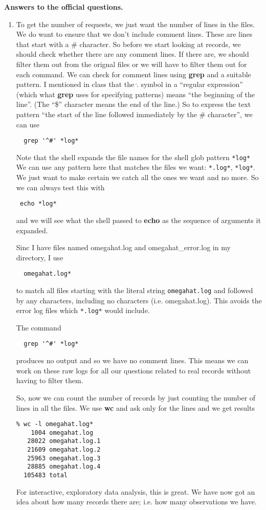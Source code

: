 \documentclass[10pt]{article}
\def\executable#1{\textbf{#1}}
\begin{document}
\textbf{Answers to the official questions.}
\begin{enumerate}
\item 
To get the number of requests, we just want the number of lines in the
files. We do want to ensure that we don't include comment lines.
These are lines that start with a \# character.
So before we start looking at records, we should check whether there
are any comment lines. If there are, we should filter them out from
the orignal files or we will have to filter them out for each command.
We can check for comment lines  using 
\executable{grep} and a suitable pattern. 
I mentioned in class that the $\hat.$ symbol in a ``regular expression''
(which what \executable{grep} uses for specifying patterns)
means ``the beginning of the line''. (The ``\$'' character means the
end of the line.)
So to express the text pattern ``the start of the line followed
immediately by the \# character'', we can use
\begin{verbatim}
  grep '^#' *log*
\end{verbatim}
Note that the shell expands the file names for the shell glob
pattern \verb+*log*+
We can use any pattern here that matches the files we want:
\verb+*.log*+,  \verb+*log*+.
We just want to make certain we catch all the ones we want and
no more. So we can always test this with
\begin{verbatim}
 echo *log*
\end{verbatim}
and we will see what the shell passed to \executable{echo}
as the sequence of arguments it expanded.

Sinc I have files named omegahat.log and omegahat\_error.log
in my directory, I use
\begin{verbatim}
  omegahat.log*
\end{verbatim}
to match all files starting with the literal string
\verb+omegahat.log+ and followed by any characters, including
no characters (i.e. omegahat.log).
This avoids the error log files which \verb+*.log*+
would include.

The command
\begin{verbatim}
  grep '^#' *log*
\end{verbatim}
produces no output and so we have no comment lines. This means
we can work on these raw logs for all our questions related to
real records without having to filter them.

So, now we can count the number of records by just
counting the number of lines in all the files.
We use \executable{wc} and ask only for the lines
and we get results 
\begin{verbatim}
% wc -l omegahat.log*
    1004 omegahat.log
   28022 omegahat.log.1
   21609 omegahat.log.2
   25963 omegahat.log.3
   28885 omegahat.log.4
  105483 total
\end{verbatim}
For interactive, exploratory data analysis, this is great.
We  have now got an idea about how many records there are;
i.e. how many observations we have.


\end{enumerate}
\end{document}
